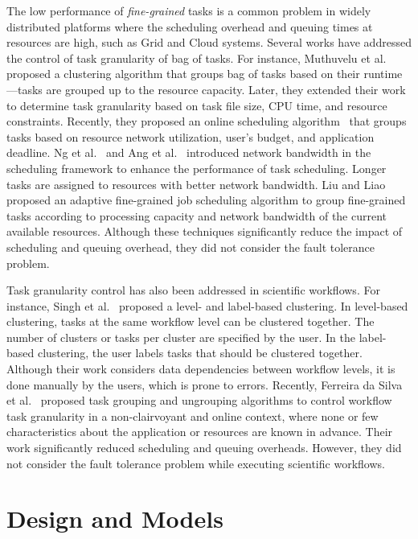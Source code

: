 \documentclass{IOS-Book-Article}
\begin{document}
The low performance of \emph{fine-grained} tasks is a common problem in widely distributed platforms where the scheduling overhead and queuing times at resources are high, such as Grid and Cloud systems. Several works have addressed the control of task granularity of bag of tasks. For instance, Muthuvelu et al.~\cite{Muthuvelu2005} proposed a clustering algorithm that groups bag of tasks based on their runtime---tasks are grouped up to the resource capacity. Later, they extended their work~\cite{4493929} to determine task granularity based on task file size, CPU time, and resource constraints. Recently, they proposed an online scheduling algorithm~\cite{Muthuvelu2010} that groups tasks based on resource network utilization, user's budget, and application deadline. Ng et al.~\cite{Keat2006} and Ang et al.~\cite{Ang2009} introduced network bandwidth in the scheduling framework to enhance the performance of task scheduling. Longer tasks are assigned to resources with better network bandwidth. Liu and Liao~\cite{Liu2009} proposed an adaptive fine-grained job scheduling algorithm to group fine-grained tasks according to processing capacity and network bandwidth of the current available resources. Although these techniques significantly reduce the impact of scheduling and queuing overhead, they did not consider the fault tolerance problem.

Task granularity control has also been addressed in scientific workflows. For instance, Singh et al.~\cite{Singh2008} proposed a level- and label-based clustering. In level-based clustering, tasks at the same workflow level can be clustered together. The number of clusters or tasks per cluster are specified by the user. In the label-based clustering, the user labels tasks that should be clustered together. Although their work considers data dependencies between workflow levels, it is done manually by the users, which is prone to errors. Recently, Ferreira da Silva et al.~\cite{Ferreira-granularity-2013} proposed task grouping and ungrouping algorithms to control workflow task granularity in a non-clairvoyant and online context, where none or few characteristics about the application or resources are known in advance. Their work significantly reduced scheduling and queuing overheads. However, they did not consider the fault tolerance problem while executing scientific workflows.





\section{Design and Models}
\label{sec:models}
\end{document}
